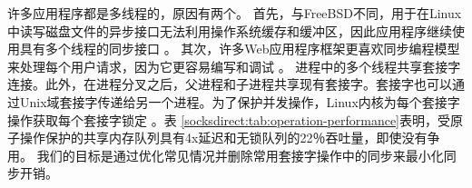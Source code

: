 许多应用程序都是多线程的，原因有两个。
首先，与FreeBSD不同，用于在Linux中读写磁盘文件的异步接口无法利用操作系统缓存和缓冲区，因此应用程序继续使用具有多个线程的同步接口 \cite {nginx-multi-thread}。
其次，许多Web应用程序框架更喜欢同步编程模型来处理每个用户请求，因为它更容易编写和调试 \cite {barroso2017attack}。
进程中的多个线程共享套接字连接。此外，在进程分叉之后，父进程和子进程共享现有套接字。套接字也可以通过Unix域套接字传递给另一个进程。为了保护并发操作，Linux内核为每个套接字操作获取每个套接字锁定 \cite {boyd2010analysis,han2012megapipe,lin2016scalable}。表 \ref {socksdirect:tab:operation-performance}表明，受原子操作保护的共享内存队列具有4x延迟和无锁队列的22％吞吐量，即使没有争用。
我们的目标是通过优化常见情况并删除常用套接字操作中的同步来最小化同步开销。






